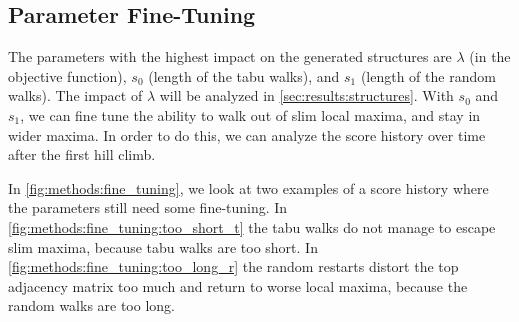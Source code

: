 \documentclass[sigconf, fleqn, prologue, dvipsnames]{acmart}
\begin{document}
\subsection{Parameter Fine-Tuning}
The parameters with the highest impact on the generated structures are $\lambda$ (in the objective function), $s_0$ (length of the tabu walks), and $s_1$ (length of the random walks).
The impact of $\lambda$ will be analyzed in \autoref{sec:results:structures}.
With $s_0$ and $s_1$, we can fine tune the ability to walk out of slim local maxima, and stay in wider maxima.
In order to do this, we can analyze the score history over time after the first hill climb.

In \autoref{fig:methods:fine_tuning}, we look at two examples of a score history where the parameters still need some fine-tuning.
In \autoref{fig:methods:fine_tuning:too_short_t} the tabu walks do not manage to escape slim maxima, because tabu walks are too short.
In \autoref{fig:methods:fine_tuning:too_long_r} the random restarts distort the top adjacency matrix too much and return to worse local maxima, because the random walks are too long.
\end{document}
